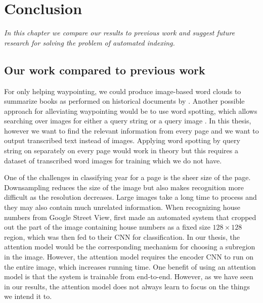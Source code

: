 \chapter{Conclusion}

\textit{In this chapter we compare our results to previous work and suggest future research for solving the problem of automated indexing.}

%
%


\section{Our work compared to previous work}

For only helping waypointing, we could produce image-based word clouds to summarize books as performed on historical documents by \textcite{ImageCloud}. Another possible approach for alleviating waypointing would be to use word spotting, which allows searching over images for either a query string or a query image \cite{WordSpotting}.
In this thesis, however we want to find the relevant information from every page and we want to output transcribed text instead of images. Applying word spotting by query string on separately on every page would work in theory but this requires a dataset of transcribed word images for training which we do not have.

One of the challenges in classifying year for a page is the sheer size of the page. Downsampling reduces the size of the image but also makes recognition more difficult as the resolution decreases. Large images take a long time to process and they may also contain much unrelated information. When recognizing house numbers from Google Street View, \textcite{multidigit_streetview} first made an automated system that cropped out the part of the image containing house numbers as a fixed size $128 \times 128$ region, which was then fed to their CNN for classification. In our thesis, the attention model would be the corresponding mechanism for choosing a subregion in the image. However, the attention model requires the encoder CNN to run on the entire image, which increases running time.
One benefit of using an attention model is that the system is trainable from end-to-end.
However, as we have seen in our results, the attention model does not always learn to focus on the things we intend it to.

